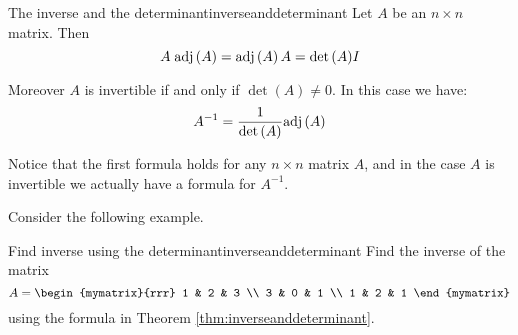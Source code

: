 \begin{theorem}{The inverse and the determinant}{inverseanddeterminant}
Let $A$ be an  $n\times n$ matrix. Then  
\begin{equation*}
A \; \mbox{adj}\left(A\right) = \mbox{adj}\left(A\right)A = {\det \left(A\right)} I
\end{equation*}

Moreover $A$ is invertible if and only if  $\det \left(A\right) \neq 0$. In this case we have: 
\begin{equation*}
A^{-1} = \frac{1}{\det \left(A\right)}  \mbox{adj}\left(A\right)
\end{equation*}
\end{theorem}


Notice that the first formula holds for any $n \times n$ matrix $A$, and in the case $A$ is invertible we actually have a formula for $A^{-1}$.

Consider the following example.

\begin{example}{Find inverse using the determinant}{inverseanddeterminant}
Find the inverse of the matrix
\begin{equation*}
A=\begin{mymatrix}{rrr}
1 & 2 & 3 \\
3 & 0 & 1 \\
1 & 2 & 1
\end{mymatrix}
\end{equation*}
using the formula in Theorem \ref{thm:inverseanddeterminant}.
\end{example}

